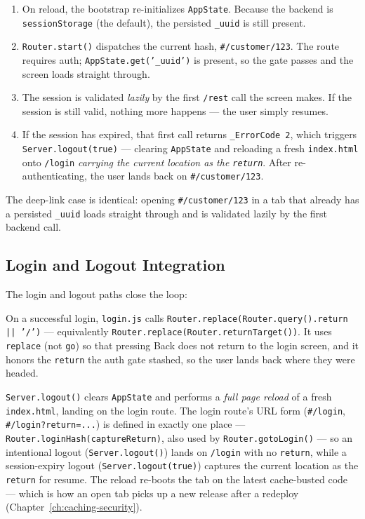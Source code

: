 \begin{enumerate}
  \item On reload, the bootstrap re-initializes \texttt{AppState}.  Because the backend is \texttt{sessionStorage} (the default), the persisted \texttt{\_uuid} is still present.
  \item \texttt{Router.start()} dispatches the current hash, \texttt{\#/customer/123}.  The route requires auth; \texttt{AppState.get('\_uuid')} is present, so the gate passes and the screen loads straight through.
  \item The session is validated \emph{lazily} by the first \texttt{/rest} call the screen makes.  If the session is still valid, nothing more happens --- the user simply resumes.
  \item If the session has expired, that first call returns \texttt{\_ErrorCode 2}, which triggers \texttt{Server.logout(true)} --- clearing \texttt{AppState} and reloading a fresh \texttt{index.html} onto \texttt{/login} \emph{carrying the current location as the \texttt{return}}.  After re-authenticating, the user lands back on \texttt{\#/customer/123}.
\end{enumerate}

\noindent
The deep-link case is identical: opening \texttt{\#/customer/123} in a tab that already has a persisted \texttt{\_uuid} loads straight through and is validated lazily by the first backend call.

\subsection{Login and Logout Integration}
\label{sec:rs-resume-loginout}

The login and logout paths close the loop:

\begin{description}[style=nextline]
  \item[Login] On a successful login, \texttt{login.js} calls \texttt{Router.replace(Router.query().return || '/')} --- equivalently \texttt{Router.replace(Router.returnTarget())}.  It uses \texttt{replace} (not \texttt{go}) so that pressing Back does not return to the login screen, and it honors the \texttt{return} the auth gate stashed, so the user lands back where they were headed.
  \item[Logout] \texttt{Server.logout()} clears \texttt{AppState} and performs a \emph{full page reload} of a fresh \texttt{index.html}, landing on the login route.  The login route's URL form (\texttt{\#/login}, \texttt{\#/login?return=...}) is defined in exactly one place --- \texttt{Router.loginHash(captureReturn)}, also used by \texttt{Router.gotoLogin()} --- so an intentional logout (\texttt{Server.logout()}) lands on \texttt{/login} with no \texttt{return}, while a session-expiry logout (\texttt{Server.logout(true)}) captures the current location as the \texttt{return} for resume.  The reload re-boots the tab on the latest cache-busted code --- which is how an open tab picks up a new release after a redeploy (Chapter~\ref{ch:caching-security}).
\end{description}


